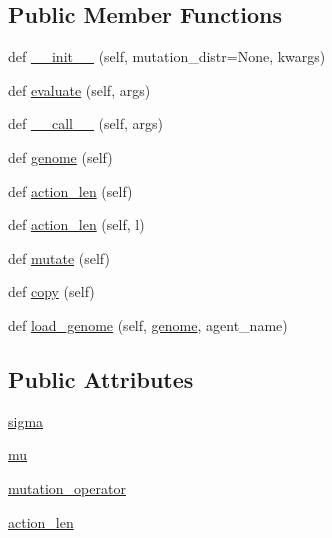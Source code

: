 \subsection*{Public Member Functions}
\begin{DoxyCompactItemize}
\item 
def \hyperlink{classtaxons_1_1core_1_1evolution_1_1agents_1_1_base_agent_a542ecb86c03a0e294fb5da09a6781df4}{\+\_\+\+\_\+init\+\_\+\+\_\+} (self, mutation\+\_\+distr=None, kwargs)
\item 
def \hyperlink{classtaxons_1_1core_1_1evolution_1_1agents_1_1_base_agent_a447d86fcc349f566f805abb94e827bdf}{evaluate} (self, args)
\item 
def \hyperlink{classtaxons_1_1core_1_1evolution_1_1agents_1_1_base_agent_ac8ef2c8f9f07f64c510c93b974a9d5ec}{\+\_\+\+\_\+call\+\_\+\+\_\+} (self, args)
\item 
def \hyperlink{classtaxons_1_1core_1_1evolution_1_1agents_1_1_base_agent_ac2bc34dba1220c78be6f78ff2dce627e}{genome} (self)
\item 
def \hyperlink{classtaxons_1_1core_1_1evolution_1_1agents_1_1_base_agent_abccbcef76ef79f56c384cbf219fa4510}{action\+\_\+len} (self)
\item 
def \hyperlink{classtaxons_1_1core_1_1evolution_1_1agents_1_1_base_agent_aa2291e7c2fe5444d4e9c7dd72679503c}{action\+\_\+len} (self, l)
\item 
def \hyperlink{classtaxons_1_1core_1_1evolution_1_1agents_1_1_base_agent_a196f7721b03b5fcf9cd1c975269a1ab8}{mutate} (self)
\item 
def \hyperlink{classtaxons_1_1core_1_1evolution_1_1agents_1_1_base_agent_a57624da363ac47974b974607fcc82c6f}{copy} (self)
\item 
def \hyperlink{classtaxons_1_1core_1_1evolution_1_1agents_1_1_base_agent_add268d06abacc75ce86cd91a80d5d570}{load\+\_\+genome} (self, \hyperlink{classtaxons_1_1core_1_1evolution_1_1agents_1_1_base_agent_ac2bc34dba1220c78be6f78ff2dce627e}{genome}, agent\+\_\+name)
\end{DoxyCompactItemize}
\subsection*{Public Attributes}
\begin{DoxyCompactItemize}
\item 
\hyperlink{classtaxons_1_1core_1_1evolution_1_1agents_1_1_base_agent_ae3a3e5cfaeab8d4d86264b4072c9f8d6}{sigma}
\item 
\hyperlink{classtaxons_1_1core_1_1evolution_1_1agents_1_1_base_agent_a7ca87986223b8c7c7b50d826bba34ac4}{mu}
\item 
\hyperlink{classtaxons_1_1core_1_1evolution_1_1agents_1_1_base_agent_a707cc21346d69f5312109cd219e2b860}{mutation\+\_\+operator}
\item 
\hyperlink{classtaxons_1_1core_1_1evolution_1_1agents_1_1_base_agent_a696898563e1c967fa7c541e5570a8d2e}{action\+\_\+len}
\end{DoxyCompactItemize}


